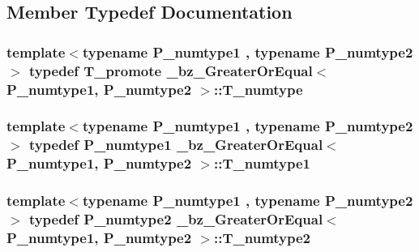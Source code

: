 \subsection{Member Typedef Documentation}
\hypertarget{class__bz__GreaterOrEqual_a1a37e3009e97239db0563d2ae2696a96}{}
\subsubsection[{T\+\_\+numtype}]{\setlength{\rightskip}{0pt plus 5cm}template$<$typename P\+\_\+numtype1 , typename P\+\_\+numtype2 $>$ typedef {\bf T\+\_\+promote} {\bf \+\_\+bz\+\_\+\+Greater\+Or\+Equal}$<$ P\+\_\+numtype1, P\+\_\+numtype2 $>$\+::{\bf T\+\_\+numtype}}\label{class__bz__GreaterOrEqual_a1a37e3009e97239db0563d2ae2696a96}
\hypertarget{class__bz__GreaterOrEqual_a427aca022106d9b3990725620e1be311}{}
\subsubsection[{T\+\_\+numtype1}]{\setlength{\rightskip}{0pt plus 5cm}template$<$typename P\+\_\+numtype1 , typename P\+\_\+numtype2 $>$ typedef P\+\_\+numtype1 {\bf \+\_\+bz\+\_\+\+Greater\+Or\+Equal}$<$ P\+\_\+numtype1, P\+\_\+numtype2 $>$\+::{\bf T\+\_\+numtype1}}\label{class__bz__GreaterOrEqual_a427aca022106d9b3990725620e1be311}
\hypertarget{class__bz__GreaterOrEqual_a1fbd58ed0a844c86926aff76b978a569}{}
\subsubsection[{T\+\_\+numtype2}]{\setlength{\rightskip}{0pt plus 5cm}template$<$typename P\+\_\+numtype1 , typename P\+\_\+numtype2 $>$ typedef P\+\_\+numtype2 {\bf \+\_\+bz\+\_\+\+Greater\+Or\+Equal}$<$ P\+\_\+numtype1, P\+\_\+numtype2 $>$\+::{\bf T\+\_\+numtype2}}\label{class__bz__GreaterOrEqual_a1fbd58ed0a844c86926aff76b978a569}
\hypertarget{class__bz__GreaterOrEqual_ac9f645d85a53224a8e3d290669b2bf26}{}
